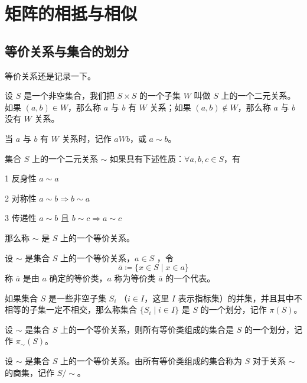 \chapter{矩阵的相抵与相似}

\section{等价关系与集合的划分}

等价关系还是记录一下。

\begin{definition}
    设 $S$ 是一个非空集合，我们把 $S\times S$ 的一个子集 $W$ 叫做 $S$ 上的一个二元关系。如果 $(a,b)\in W$，那么称 $a$ 与 $b$ 有 $W$ 关系；如果 $(a,b)\notin W$，那么称 $a$ 与 $b$ 没有 $W$ 关系。
\end{definition}

当 $a$ 与 $b$ 有 $W$ 关系时，记作 $aWb$，或 $a\sim b$。

\begin{definition}
    集合 $S$ 上的一个二元关系 $\sim$ 如果具有下述性质：$\forall a,b,c\in S$，有

    \num{1} 反身性 $a\sim a$

    \num{2} 对称性 $a\sim b \Rightarrow b\sim a$

    \num{3} 传递性 $a\sim b$ 且 $b\sim c \Rightarrow a\sim c$ 

    那么称 $\sim$ 是 $S$ 上的一个等价关系。
\end{definition}

\begin{definition}
    设 $\sim$ 是集合 $S$ 上的一个等价关系，$a\in S$ ，令
    \[\overline{a} \coloneqq  \{x\in S \mid x\in a\}\]
    称 $\overline{a}$ 是由 $a$ 确定的等价类，$a$ 称为等价类 $\overline{a}$ 的一个代表。
\end{definition}

\begin{definition}
    如果集合 $S$ 是一些非空子集 $S_i$ （$i\in I$，这里 $I$ 表示指标集）的并集，并且其中不相等的子集一定不相交，那么称集合 $\{S
    _i \mid i\in I\}$ 是 $S$ 的一个划分，记作 $\pi(S)$。
\end{definition}

\begin{theorem}
    设 $\sim$ 是集合 $S$ 上的一个等价关系，则所有等价类组成的集合是 $S$ 的一个划分，记作 $\pi_\sim(S)$。
\end{theorem}

\begin{definition}
    设 $\sim$ 是集合 $S$ 上的一个等价关系。由所有等价类组成的集合称为 $S$ 对于关系 $\sim$ 的商集，记作 $S/\sim$。
\end{definition}

